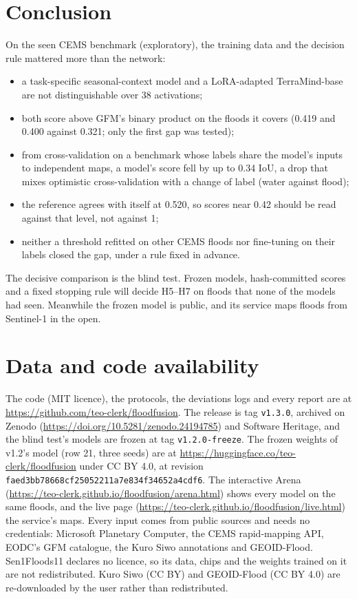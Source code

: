 \documentclass[10pt,twocolumn,a4paper]{article}
\begin{document}
\section{Conclusion}
On the seen CEMS benchmark (exploratory), the training data and the decision rule mattered more than the network:
\begin{itemize}
  \item a task-specific seasonal-context model and a LoRA-adapted TerraMind-base are not distinguishable over 38
    activations;
  \item both score above GFM's binary product on the floods it covers (0.419 and 0.400 against 0.321; only the first
    gap was tested);
  \item from cross-validation on a benchmark whose labels share the model's inputs to independent maps, a model's
    score fell by up to 0.34 IoU, a drop that mixes optimistic cross-validation with a change of label (water against
    flood);
  \item the reference agrees with itself at 0.520, so scores near 0.42 should be read against that level, not
    against 1;
  \item neither a threshold refitted on other CEMS floods nor fine-tuning on their labels closed the gap, under a
    rule fixed in advance.
\end{itemize}
The decisive comparison is the blind test. Frozen models, hash-committed scores and a fixed stopping rule will decide
H5--H7 on floods that none of the models had seen. Meanwhile the frozen model is public, and its service maps floods
from Sentinel-1 in the open.

\section*{Data and code availability}
The code (MIT licence), the protocols, the deviations logs and every report are at
\url{https://github.com/teo-clerk/floodfusion}. The release is tag \texttt{v1.3.0}, archived on Zenodo
(\url{https://doi.org/10.5281/zenodo.24194785}) and Software Heritage, and the blind test's models are frozen at tag
\texttt{v1.2.0-freeze}. The frozen weights of v1.2's model (row 21, three seeds) are at
\url{https://huggingface.co/teo-clerk/floodfusion} under CC BY 4.0, at revision
\texttt{faed3bb78668cf25052211a7e834f34652a4cdf6}. The interactive Arena
(\url{https://teo-clerk.github.io/floodfusion/arena.html}) shows every model on the same floods, and the live page
(\url{https://teo-clerk.github.io/floodfusion/live.html}) the service's maps. Every input comes from public sources
and needs no credentials: Microsoft Planetary Computer, the CEMS rapid-mapping API, EODC's GFM catalogue, the Kuro
Siwo annotations and GEOID-Flood. Sen1Floods11 declares no licence, so its data, chips and the weights trained on it
are not redistributed. Kuro Siwo (CC BY) and GEOID-Flood (CC BY 4.0) are re-downloaded by the user rather than
redistributed.
\end{document}
